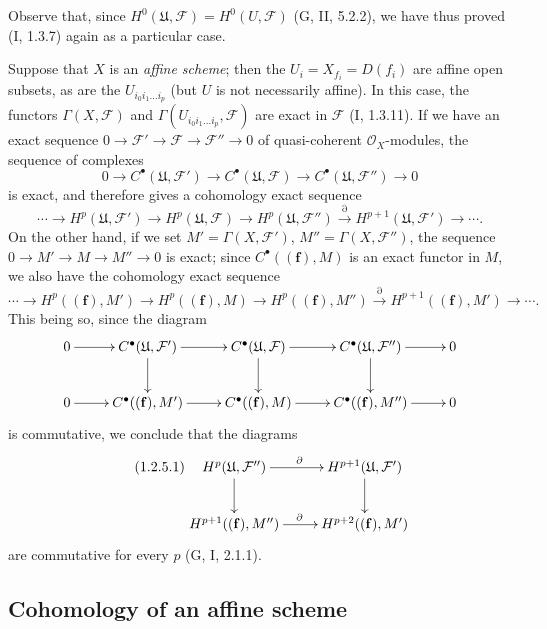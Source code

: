 Observe that, since
$H^0(\mathfrak U,\mathcal F)=H^0(U,\mathcal F)$ (G, II, 5.2.2), we have thus
proved (I, 1.3.7) again as a particular case.

\begin{remark}[1.2.5]
\label{III.1.2.5}
Suppose that $X$ is an \emph{affine scheme}; then the
$U_i=X_{f_i}=D(f_i)$ are affine open subsets, as are the
$U_{i_0i_1\ldots i_p}$ (but $U$ is not necessarily affine). In this
case, the functors $\Gamma(X,\mathcal F)$ and
$\Gamma(U_{i_0i_1\ldots i_p},\mathcal F)$ are exact in $\mathcal F$
(I, 1.3.11). If we have an exact sequence
$0\to\mathcal F'\to\mathcal F\to\mathcal F''\to0$ of quasi-coherent
$\mathcal O_X$-modules, the sequence of complexes
\[
0\longrightarrow C^\bullet(\mathfrak U,\mathcal F')
\longrightarrow C^\bullet(\mathfrak U,\mathcal F)
\longrightarrow C^\bullet(\mathfrak U,\mathcal F'')
\longrightarrow0
\]
is exact, and therefore gives a cohomology exact sequence
\[
\cdots\longrightarrow H^p(\mathfrak U,\mathcal F')
\longrightarrow H^p(\mathfrak U,\mathcal F)
\longrightarrow H^p(\mathfrak U,\mathcal F'')
\xrightarrow{\partial}H^{p+1}(\mathfrak U,\mathcal F')
\longrightarrow\cdots.
\]
On the other hand, if we set $M'=\Gamma(X,\mathcal F')$,
$M''=\Gamma(X,\mathcal F'')$, the sequence
$0\to M'\to M\to M''\to0$ is exact; since
$C^\bullet((\mathbf f),M)$ is an exact functor in $M$, we also have the
cohomology exact sequence
\[
\cdots\longrightarrow H^p((\mathbf f),M')
\longrightarrow H^p((\mathbf f),M)
\longrightarrow H^p((\mathbf f),M'')
\xrightarrow{\partial}H^{p+1}((\mathbf f),M')
\longrightarrow\cdots.
\]
This being so, since the diagram
\[
\xymatrix{
0\ar[r]&C^\bullet(\mathfrak U,\mathcal F')\ar[r]\ar[d]
&C^\bullet(\mathfrak U,\mathcal F)\ar[r]\ar[d]
&C^\bullet(\mathfrak U,\mathcal F'')\ar[r]\ar[d]&0\\
0\ar[r]&C^\bullet((\mathbf f),M')\ar[r]
&C^\bullet((\mathbf f),M)\ar[r]
&C^\bullet((\mathbf f),M'')\ar[r]&0
}
\]
is commutative, we conclude that the diagrams
\begin{equation}
\label{III.1.2.5.1}
\tag{1.2.5.1}
\xymatrix{
H^p(\mathfrak U,\mathcal F'')\ar[r]^{\partial}\ar[d]
&H^{p+1}(\mathfrak U,\mathcal F')\ar[d]\\
H^{p+1}((\mathbf f),M'')\ar[r]^{\partial}
&H^{p+2}((\mathbf f),M')
}
\end{equation}
are commutative for every $p$ (G, I, 2.1.1).
\end{remark}

\subsection{Cohomology of an affine scheme}
\label{subsection:III.1.3}

